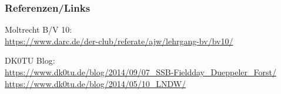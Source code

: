 \renewcommand{\refname}{Referenzen}

\begin{frame}
  \frametitle{Referenzen/Links}
  \hypertarget{refs}{}
  \footnotesize

  \begin{thebibliography}{}
     Moltrecht B/V 10: \\
      \url{https://www.darc.de/der-club/referate/ajw/lehrgang-bv/bv10/}

      DK0TU Blog: \\
      \url{https://www.dk0tu.de/blog/2014/09/07_SSB-Fieldday_Dueppeler_Forst/}
      \url{https://www.dk0tu.de/blog/2014/05/10_LNDW/}
  \end{thebibliography}

\end{frame}


